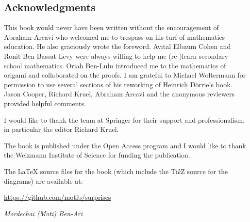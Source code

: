 \subsection*{Acknowledgments}

This book would never have been written without the encouragement of Abraham Arcavi who welcomed me to trespass on his turf of mathematics education. He also graciously wrote the foreword. Avital Elbaum Cohen and Ronit Ben-Bassat Levy were always willing to help me (re-)learn secondary-school mathematics. Oriah Ben-Lulu introduced me to the mathematics of origami and collaborated on the proofs. I am grateful to Michael Woltermann for permission to use several sections of his reworking of Heinrich D\"{o}rrie's book. Jason Cooper, Richard Kruel, Abraham Arcavi and the anonymous reviewers provided helpful comments.

I would like to thank the team at Springer for their support and professionalism, in particular the editor Richard Kruel.

The book is published under the Open Access program and I would like to thank the Weizmann Institute of Science for funding the publication.

The \LaTeX{} source files for the book (which include the Ti\textit{k}Z source for the diagrams) are available at:
\begin{center}
\url{https://github.com/motib/surprises}
\end{center}

\medskip

\begin{flushright}
\textit{Mordechai (Moti) Ben-Ari}
\end{flushright}

\tableofcontents

